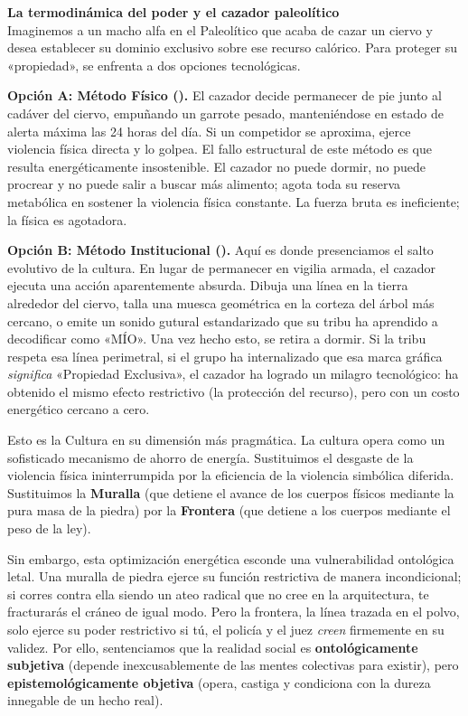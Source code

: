\begin{argumento}
\textbf{La termodinámica del poder y el cazador paleolítico}\\
Imaginemos a un macho alfa en el Paleolítico que acaba de cazar un ciervo y desea establecer su dominio exclusivo sobre ese recurso calórico. Para proteger su «propiedad», se enfrenta a dos opciones tecnológicas.

\textbf{Opción A: Método Físico (\HechoBruto).} El cazador decide permanecer de pie junto al cadáver del ciervo, empuñando un garrote pesado, manteniéndose en estado de alerta máxima las 24 horas del día. Si un competidor se aproxima, ejerce violencia física directa y lo golpea. El fallo estructural de este método es que resulta energéticamente insostenible. El cazador no puede dormir, no puede procrear y no puede salir a buscar más alimento; agota toda su reserva metabólica en sostener la violencia física constante. La fuerza bruta es ineficiente; la física es agotadora.

\textbf{Opción B: Método Institucional (\HechoInstitucional).} Aquí es donde presenciamos el salto evolutivo de la cultura. En lugar de permanecer en vigilia armada, el cazador ejecuta una acción aparentemente absurda. Dibuja una línea en la tierra alrededor del ciervo, talla una muesca geométrica en la corteza del árbol más cercano, o emite un sonido gutural estandarizado que su tribu ha aprendido a decodificar como «MÍO». Una vez hecho esto, se retira a dormir. Si la tribu respeta esa línea perimetral, si el grupo ha internalizado que esa marca gráfica \textit{significa} «Propiedad Exclusiva», el cazador ha logrado un milagro tecnológico: ha obtenido el mismo efecto restrictivo (la protección del recurso), pero con un costo energético cercano a cero.
\end{argumento}

Esto es la Cultura en su dimensión más pragmática. La cultura opera como un sofisticado mecanismo de ahorro de energía. Sustituimos el desgaste de la violencia física ininterrumpida por la eficiencia de la violencia simbólica diferida. Sustituimos la \textbf{Muralla} (que detiene el avance de los cuerpos físicos mediante la pura masa de la piedra) por la \textbf{Frontera} (que detiene a los cuerpos mediante el peso de la ley).

Sin embargo, esta optimización energética esconde una vulnerabilidad ontológica letal. Una muralla de piedra ejerce su función restrictiva de manera incondicional; si corres contra ella siendo un ateo radical que no cree en la arquitectura, te fracturarás el cráneo de igual modo. Pero la frontera, la línea trazada en el polvo, solo ejerce su poder restrictivo si tú, el policía y el juez \textit{creen} firmemente en su validez. Por ello, sentenciamos que la realidad social es \textbf{ontológicamente subjetiva} (depende inexcusablemente de las mentes colectivas para existir), pero \textbf{epistemológicamente objetiva} (opera, castiga y condiciona con la dureza innegable de un hecho real).


